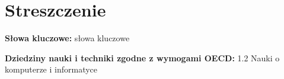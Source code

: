 \section*{Streszczenie}
\lipsum[5]

\vspace{1cm}
\noindent
\textbf{Słowa kluczowe:} słowa kluczowe

\vspace{1cm}
\noindent
\textbf{Dziedziny nauki i techniki zgodne z wymogami OECD:} 1.2 Nauki o komputerze i informatyce
